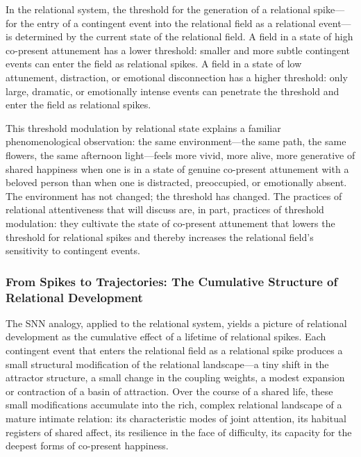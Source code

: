 In the relational system, the threshold for the generation of a relational spike---for the entry of a contingent event into the relational field as a relational event---is determined by the current state of the relational field. A field in a state of high co-present attunement has a lower threshold: smaller and more subtle contingent events can enter the field as relational spikes. A field in a state of low attunement, distraction, or emotional disconnection has a higher threshold: only large, dramatic, or emotionally intense events can penetrate the threshold and enter the field as relational spikes.

This threshold modulation by relational state explains a familiar phenomenological observation: the same environment---the same path, the same flowers, the same afternoon light---feels more vivid, more alive, more generative of shared happiness when one is in a state of genuine co-present attunement with a beloved person than when one is distracted, preoccupied, or emotionally absent. The environment has not changed; the threshold has changed. The practices of relational attentiveness that  will discuss are, in part, practices of threshold modulation: they cultivate the state of co-present attunement that lowers the threshold for relational spikes and thereby increases the relational field's sensitivity to contingent events.

\subsubsection{From Spikes to Trajectories: The Cumulative Structure of Relational Development}
\label{p14:subsubsec:cumulative}

\noindent
The SNN analogy, applied to the relational system, yields a picture of relational development as the cumulative effect of a lifetime of relational spikes. Each contingent event that enters the relational field as a relational spike produces a small structural modification of the relational landscape---a tiny shift in the attractor structure, a small change in the coupling weights, a modest expansion or contraction of a basin of attraction. Over the course of a shared life, these small modifications accumulate into the rich, complex relational landscape of a mature intimate relation: its characteristic modes of joint attention, its habitual registers of shared affect, its resilience in the face of difficulty, its capacity for the deepest forms of co-present happiness.

